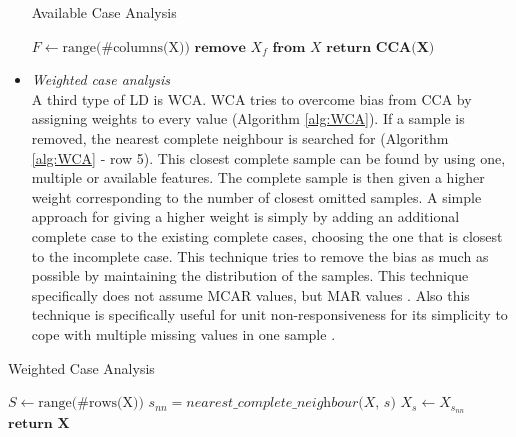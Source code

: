 \documentclass[10pt,a4paper]{report}
\begin{document}
\begin{itemize}
		\begin{algorithm}[H]
			\caption{Available Case Analysis}\label{alg:ACA}
			\begin{algorithmic}[1]
				\State $F \gets \text{range(\#columns(X))}$ 	
				 					
				 				 			
				\State $\textbf{remove } X_f \textbf{ from } X$ 				
				\EndIf
				\EndFor
				\State $\textbf{return CCA(X)}$
				\EndProcedure
			\end{algorithmic}
		\end{algorithm}	
		
		\item \textit{Weighted case analysis} \\
		A third type of LD is WCA. WCA tries to overcome bias from CCA by assigning 
		weights to every value (Algorithm \ref{alg:WCA}). If a sample is removed, 
		the nearest complete neighbour is searched for (Algorithm \ref{alg:WCA} -  
		row 5). This closest complete sample can be found by using one, multiple or 
		available features. The complete sample is then given a higher weight 
		corresponding to the number of closest omitted samples. A simple approach 
		for giving a higher weight is simply by adding an additional complete case 
		to the existing complete cases, choosing the one that is closest to the 
		incomplete case. This technique tries to remove the bias as much as 
		possible by maintaining the distribution of the samples. This technique 
		specifically does not assume MCAR values, but MAR 
		values \cite{haukoos2007advanced, donders2006gentle}. Also this 
		technique is specifically useful for unit non-responsiveness for its 
		simplicity to cope with multiple missing values in one 
		sample \cite{patrician2002multiple}.
	\end{itemize}
	
	\begin{algorithm}[H]
		\caption{Weighted Case Analysis}\label{alg:WCA}
		\begin{algorithmic}[1]
			\State $S \gets \text{range(\#rows(X))}$ 	
			 					
			 				 			
			\State $s_{nn} = \textit{nearest\_complete\_neighbour(X, s)}$	
			\State $ X_s \gets X_{s_{nn}}$ 				
			\EndIf
			\EndFor
			\State $\textbf{return X}$
			\EndProcedure
		\end{algorithmic}
	\end{algorithm}	
	
\end{document}
